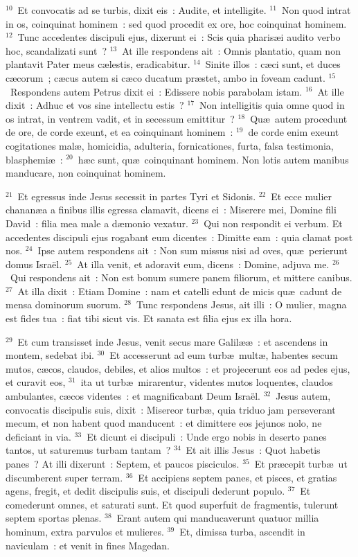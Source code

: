 ${}^{10}$~Et convocatis ad se turbis, dixit eis~: Audite, et intelligite.
${}^{11}$~Non quod intrat in os, coinquinat hominem~: sed quod procedit ex ore, hoc coinquinat hominem.
${}^{12}$~Tunc accedentes discipuli ejus, dixerunt ei~: Scis quia pharis\ae i audito verbo hoc, scandalizati sunt~?
${}^{13}$~At ille respondens ait~: Omnis plantatio, quam non plantavit Pater meus c\ae lestis, eradicabitur.
${}^{14}$~Sinite illos~: c\ae ci sunt, et duces c\ae corum~; c\ae cus autem si c\ae co ducatum pr\ae stet, ambo in foveam cadunt.
${}^{15}$~Respondens autem Petrus dixit ei~: Edissere nobis parabolam istam.
${}^{16}$~At ille dixit~: Adhuc et vos sine intellectu estis~?
${}^{17}$~Non intelligitis quia omne quod in os intrat, in ventrem vadit, et in secessum emittitur~?
${}^{18}$~Qu\ae\ autem procedunt de ore, de corde exeunt, et ea coinquinant hominem~:
${}^{19}$~de corde enim exeunt cogitationes mal\ae , homicidia, adulteria, fornicationes, furta, falsa testimonia, blasphemi\ae~:
${}^{20}$~h\ae c sunt, qu\ae\ coinquinant hominem. Non lotis autem manibus manducare, non coinquinat hominem.


${}^{21}$~Et egressus inde Jesus secessit in partes Tyri et Sidonis.
${}^{22}$~Et ecce mulier chanan\ae a a finibus illis egressa clamavit, dicens ei~: Miserere mei, Domine fili David~: filia mea male a d\ae monio vexatur.
${}^{23}$~Qui non respondit ei verbum. Et accedentes discipuli ejus rogabant eum dicentes~: Dimitte eam~: quia clamat post nos.
${}^{24}$~Ipse autem respondens ait~: Non sum missus nisi ad oves, qu\ae\ perierunt domus Isra\"el.
${}^{25}$~At illa venit, et adoravit eum, dicens~: Domine, adjuva me.
${}^{26}$~Qui respondens ait~: Non est bonum sumere panem filiorum, et mittere canibus.
${}^{27}$~At illa dixit~: Etiam Domine~: nam et catelli edunt de micis qu\ae\ cadunt de mensa dominorum suorum.
${}^{28}$~Tunc respondens Jesus, ait illi~: O mulier, magna est fides tua~: fiat tibi sicut vis. Et sanata est filia ejus ex illa hora.


${}^{29}$~Et cum transisset inde Jesus, venit secus mare Galil\ae \ae~: et ascendens in montem, sedebat ibi.
${}^{30}$~Et accesserunt ad eum turb\ae\ mult\ae , habentes secum mutos, c\ae cos, claudos, debiles, et alios multos~: et projecerunt eos ad pedes ejus, et curavit eos,
${}^{31}$~ita ut turb\ae\ mirarentur, videntes mutos loquentes, claudos ambulantes, c\ae cos videntes~: et magnificabant Deum Isra\"el.
${}^{32}$~Jesus autem, convocatis discipulis suis, dixit~: Misereor turb\ae , quia triduo jam perseverant mecum, et non habent quod manducent~: et dimittere eos jejunos nolo, ne deficiant in via.
${}^{33}$~Et dicunt ei discipuli~: Unde ergo nobis in deserto panes tantos, ut saturemus turbam tantam~?
${}^{34}$~Et ait illis Jesus~: Quot habetis panes~? At illi dixerunt~: Septem, et paucos pisciculos.
${}^{35}$~Et pr\ae cepit turb\ae\ ut discumberent super terram.
${}^{36}$~Et accipiens septem panes, et pisces, et gratias agens, fregit, et dedit discipulis suis, et discipuli dederunt populo.
${}^{37}$~Et comederunt omnes, et saturati sunt. Et quod superfuit de fragmentis, tulerunt septem sportas plenas.
${}^{38}$~Erant autem qui manducaverunt quatuor millia hominum, extra parvulos et mulieres.
${}^{39}$~Et, dimissa turba, ascendit in naviculam~: et venit in fines Magedan.


